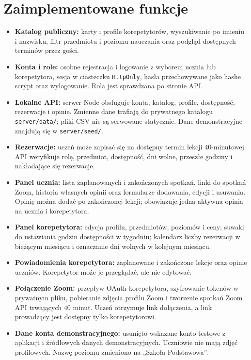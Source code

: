 \documentclass[10pt,a4paper]{article}
\begin{document}
\section{Zaimplementowane funkcje}
\begin{itemize}
\item \textbf{Katalog publiczny:} karty i profile korepetytorów, wyszukiwanie po imieniu i nazwisku, filtr przedmiotu i poziomu nauczania oraz podgląd dostępnych terminów przez gości.
\item \textbf{Konta i role:} osobne rejestracja i logowanie z wyborem ucznia lub korepetytora, sesja w ciasteczku \texttt{HttpOnly}, hasła przechowywane jako hashe scrypt oraz wylogowanie. Rola jest sprawdzana po stronie API.
\item \textbf{Lokalne API:} serwer Node obsługuje konta, katalog, profile, dostępność, rezerwacje i opinie. Zmienne dane trafiają do prywatnego katalogu \texttt{server/data/}; pliki CSV nie są serwowane statycznie. Dane demonstracyjne znajdują się w \texttt{server/seed/}.
\item \textbf{Rezerwacje:} uczeń może zapisać się na dostępny termin lekcji 40-minutowej. API weryfikuje rolę, przedmiot, dostępność, dni wolne, przeszłe godziny i nakładające się rezerwacje.
\item \textbf{Panel ucznia:} lista zaplanowanych i zakończonych spotkań, linki do spotkań Zoom, historia własnych opinii oraz formularze dodawania, edycji i usuwania. Opinię można dodać po zakończonej lekcji; obowiązuje jedna aktywna opinia na ucznia i korepetytora.
\item \textbf{Panel korepetytora:} edycja profilu, przedmiotów, poziomów i ceny; suwaki do ustawiania godzin dostępności w tygodniu; kalendarz liczby rezerwacji w bieżącym miesiącu i oznaczanie dni wolnych w kolejnym miesiącu.
\item \textbf{Powiadomienia korepetytora:} zaplanowane i zakończone lekcje oraz opinie uczniów. Korepetytor może je przeglądać, ale nie edytować.
\item \textbf{Połączenie Zoom:} przepływ OAuth korepetytora, szyfrowanie tokenów w prywatnym pliku, pobieranie zdjęcia profilu Zoom i tworzenie spotkań Zoom API trwających 40 minut. Uczeń otrzymuje link dołączenia, a link prowadzący jest dostępny tylko korepetytorowi.
\item \textbf{Dane konta demonstracyjnego:} usunięto wskazane konto testowe z aplikacji i źródłowych danych demonstracyjnych. Uczniowie nie mają zdjęć profilowych. Nazwę poziomu zmieniono na „Szkoła Podstawowa”.
\end{itemize}
\end{document}
